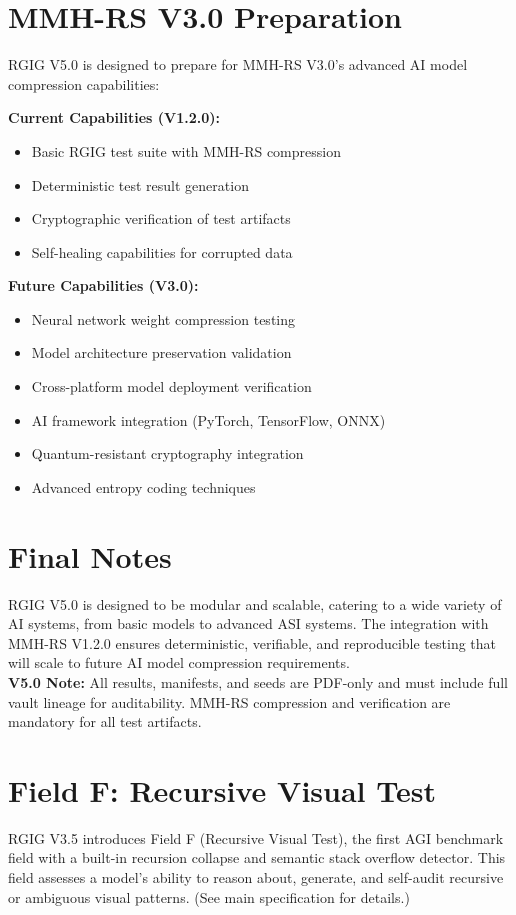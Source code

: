 \section*{MMH-RS V3.0 Preparation}
RGIG V5.0 is designed to prepare for MMH-RS V3.0's advanced AI model compression capabilities:

\textbf{Current Capabilities (V1.2.0):}
\begin{itemize}
  \item Basic RGIG test suite with MMH-RS compression
  \item Deterministic test result generation
  \item Cryptographic verification of test artifacts
  \item Self-healing capabilities for corrupted data
\end{itemize}

\textbf{Future Capabilities (V3.0):}
\begin{itemize}
  \item Neural network weight compression testing
  \item Model architecture preservation validation
  \item Cross-platform model deployment verification
  \item AI framework integration (PyTorch, TensorFlow, ONNX)
  \item Quantum-resistant cryptography integration
  \item Advanced entropy coding techniques
\end{itemize}

\section*{Final Notes}
RGIG V5.0 is designed to be modular and scalable, catering to a wide variety of AI systems, from basic models to advanced ASI systems. The integration with MMH-RS V1.2.0 ensures deterministic, verifiable, and reproducible testing that will scale to future AI model compression requirements.\\
\textbf{V5.0 Note:} All results, manifests, and seeds are PDF-only and must include full vault lineage for auditability. MMH-RS compression and verification are mandatory for all test artifacts.

\section*{Field F: Recursive Visual Test}
RGIG V3.5 introduces Field F (Recursive Visual Test), the first AGI benchmark field with a built-in recursion collapse and semantic stack overflow detector. This field assesses a model's ability to reason about, generate, and self-audit recursive or ambiguous visual patterns. (See main specification for details.)

